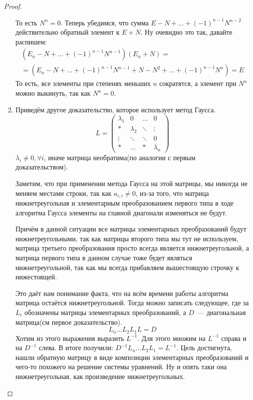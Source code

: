 \begin{proof}
\begin{enumerate}
            То есть $N^n = 0$.  Теперь убедимся, что сумма  $E - N + \dots + (-1)^{n-1}N^{n-2}$ действительно обратный элемент
            к  $E + N$. Ну очевидно это так, давайте распишем:
            \[
                \begin{gathered}
                    \left(E_n - N + \dots + (-1)^{n-1}N^{n-1}\right)(E_n + N)=\\=
                    \left(E_n - N + \dots + (-1)^{n-1}N^{n-1} + N - N^2 + \dots + (-1)^{n-1}N^n\right)= E
                \end{gathered}
            \]
            То есть, все элементы при степенях меньших $n$ сократятся, а элемент при $N^n$ можно 
            выкинуть, так как $N^n = 0$.
        \item
            Приведём другое доказательство, которое использует метод Гаусса.\\
             \[
            L = 
            \begin{pmatrix}
                \lambda_1&0&\dots&0\\
                *&\lambda_2&\ddots&\vdots\\
                \vdots&\ddots&\ddots&0\\
                *&\dots&*&\lambda_n
            \end{pmatrix}
             \] 
             $\lambda_i \not= 0,\forall i$, иначе матрица необратима(по аналогии с первым доказательством).

             Заметим, что при применении метода Гаусса на этой матрицы, мы никогда не
             меняем местами строки, так как $a_{i,i} \not= 0$, из-за того, что матрица
             нижнетреугольная и элементарным преобразованием первого типа в ходе алгоритма
             Гаусса элементы на главной диагонали изменяться не будут.

             Причём в данной ситуации все матрицы элементарных преобразований будут нижнетреугольными, 
             так как матрицы второго типа мы тут не используем, матрица третьего преобразования просто всегда
             является нижнетреугольной, а матрица первого типа в данном случае тоже будет являться нижнетреугольной,
             так как мы всегда прибавляем вышестоящую строчку к нижестоящей.

             Это даёт нам понимание факта, что на всём времени работы алгоритма матрица остаётся нижнетреугольной.
             Тогда можно записать следующее, где за $L_i$ обозначены матрицы элементарных преобразований, а 
             $D$~--- диагональная матрица(см первое доказательство).
             \[
                 L_n\ldots L_2L_1L=D
             \]
             Хотим из этого выражения выразить $L^{-1}$. Для этого множим на $L^{-1}$ справа
             и на $D^{-1}$ слева. В итоге получили: $D^{-1}L_n\ldots L_2L_1 = L^{-1}$.
             Цель достигнута, нашли обратную матрицу в виде композиции элементарных преобразований и чего-то похожего на решение
             системы уравнений. Ну и опять таки она нижнетреугольная, как произведение нижнетреугольных.
    \end{enumerate}
\end{proof}
